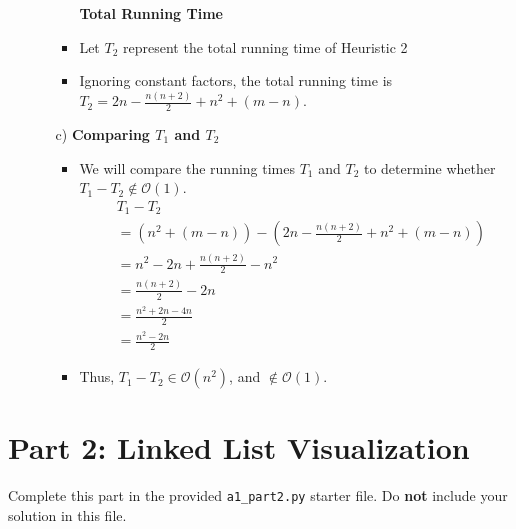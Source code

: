 \documentclass[fontsize=11pt]{article}
\begin{document}
\begin{enumerate}
\begin{enumerate}
\begin{itemize}
        \textbf{Total Running Time}
        \item Let $T_2$ represent the total running time of Heuristic 2
        \item Ignoring constant factors, the total running time is $T_2 = 2n - \frac{n(n+2)}{2} + n^2 + (m - n)$.\\
    \end{itemize}
    
    \item[c)] \textbf{Comparing $T_1$ and $T_2$}
    \begin{itemize}
        \item We will compare the running times $T_1$ and $T_2$ to determine whether $T_1 - T_2 \notin \mathcal{O}(1)$.  
        \begin{align}
            & T_1 - T_2\\
            &= (n^2 + (m - n)) - (2n - \frac{n(n+2)}{2} + n^2 + (m - n))\\
            &= n^2 - 2n + \frac{n(n+2)}{2} - n^2\\
            &= \frac{n(n+2)}{2} - 2n\\
            &= \frac{n^2 + 2n - 4n}{2}\\
            &= \frac{n^2 - 2n}{2}
        \end{align}
        \item Thus, $T_1 - T_2 \in \mathcal{O}(n^2)$, and $\notin \mathcal{O}(1)$. 
    \end{itemize}
\end{enumerate}
\end{enumerate}

\section*{Part 2: Linked List Visualization}
Complete this part in the provided \texttt{a1\_part2.py} starter file.
Do \textbf{not} include your solution in this file.
\end{document}
